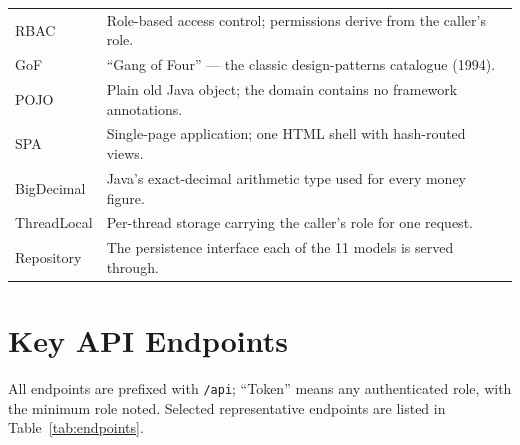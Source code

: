 \documentclass[12pt,a4paper]{report}
\begin{document}
\begin{table}[H]
\begin{tabularx}{\textwidth}{l X}
RBAC & Role-based access control; permissions derive from the caller's role. \\
GoF & ``Gang of Four'' --- the classic design-patterns catalogue (1994). \\
POJO & Plain old Java object; the domain contains no framework annotations. \\
SPA & Single-page application; one HTML shell with hash-routed views. \\
BigDecimal & Java's exact-decimal arithmetic type used for every money figure. \\
ThreadLocal & Per-thread storage carrying the caller's role for one request. \\
Repository & The persistence interface each of the 11 models is served through. \\
\bottomrule
\end{tabularx}
\end{table}

\section{Key API Endpoints}
\label{app:endpoints}
All endpoints are prefixed with \texttt{/api}; ``Token'' means any authenticated role,
with the minimum role noted. Selected representative endpoints are listed in
Table~\ref{tab:endpoints}.
\end{document}
